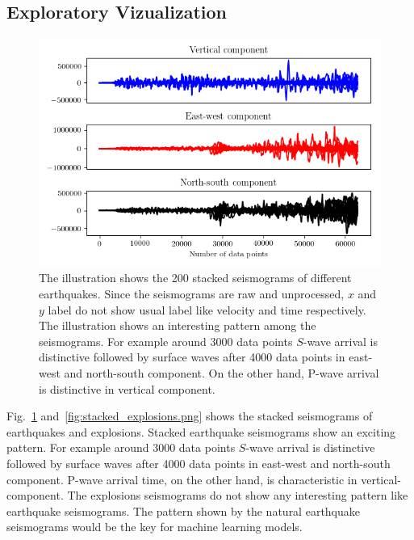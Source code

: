 \documentclass[12pt]{article}
\begin{document}
        \subsection{Exploratory Vizualization}
        
        \begin{figure}[!htb]
            \begin{center}
            \includegraphics[scale=0.8]{figures/stacked_earthquakes.png}
            \end{center}
            \caption{The illustration shows the 200 stacked seismograms of different earthquakes. Since the seismograms are raw and unprocessed, $x$ and $y$ label do not show usual label like velocity and time respectively. The illustration shows an interesting pattern among the seismograms. For example around 3000 data points $S$-wave arrival is distinctive followed by surface waves after 4000 data points in east-west and north-south component. On the other hand, P-wave arrival is distinctive in vertical component.}
            \label{fig:stacked_earthquakes.png}
        \end{figure}
    
        Fig.~\ref{fig:stacked_earthquakes.png} and~\ref{fig:stacked_explosions.png} shows the stacked seismograms of earthquakes and explosions. Stacked earthquake seismograms show an exciting pattern. For example around 3000 data points $S$-wave arrival is distinctive followed by surface waves after 4000 data points in east-west and north-south component. P-wave arrival time, on the other hand, is characteristic in vertical-component. The explosions seismograms do not show any interesting pattern like earthquake seismograms. The pattern shown by the natural earthquake seismograms would be the key for machine learning models.
    
\end{document}
